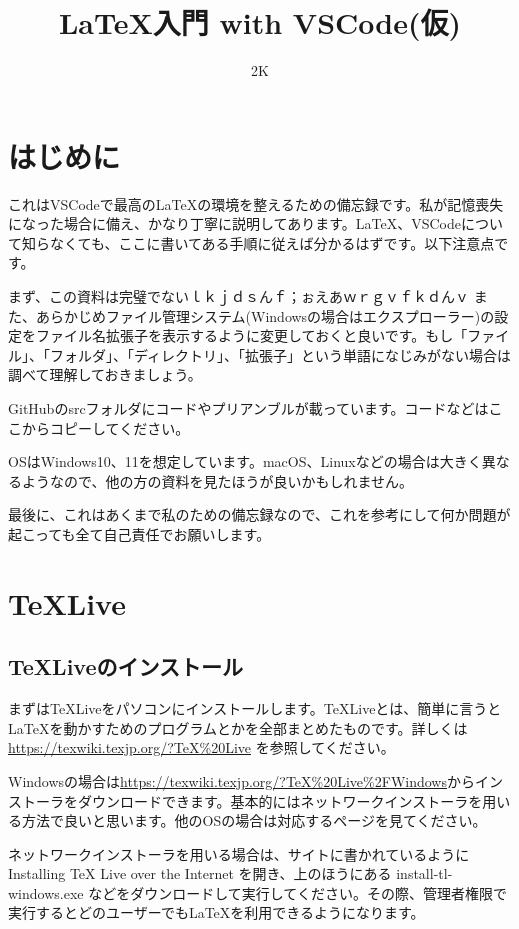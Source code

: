 

\title{\LaTeX 入門 with VSCode(仮)}
\author{2K}


\maketitle

\section{はじめに}
これはVSCodeで最高の\LaTeX の環境を整えるための備忘録です。私が記憶喪失になった場合に備え、かなり丁寧に説明してあります。LaTeX、VSCodeについて知らなくても、ここに書いてある手順に従えば分かるはずです。以下注意点です。

まず、この資料は完璧でないｌｋｊｄｓんｆ；ぉえあｗｒｇｖｆｋｄんｖ
また、あらかじめファイル管理システム(Windowsの場合はエクスプローラー)の設定をファイル名拡張子を表示するように変更しておくと良いです。もし「ファイル」、「フォルダ」、「ディレクトリ」、「拡張子」という単語になじみがない場合は調べて理解しておきましょう。

GitHubのsrcフォルダにコードやプリアンブルが載っています。コードなどはここからコピーしてください。

OSはWindows10、11を想定しています。macOS、Linuxなどの場合は大きく異なるようなので、他の方の資料を見たほうが良いかもしれません。

最後に、これはあくまで私のための備忘録なので、これを参考にして何か問題が起こっても全て自己責任でお願いします。

\section{\TeX Live}
\subsection{\TeX Liveのインストール}
まずは\TeX Liveをパソコンにインストールします。\TeX Liveとは、簡単に言うと\LaTeX を動かすためのプログラムとかを全部まとめたものです。詳しくは \url{https://texwiki.texjp.org/?TeX%20Live} を参照してください。

Windowsの場合は\url{https://texwiki.texjp.org/?TeX%20Live%2FWindows}からインストーラをダウンロードできます。基本的にはネットワークインストーラを用いる方法で良いと思います。他のOSの場合は対応するページを見てください。

ネットワークインストーラを用いる場合は、サイトに書かれているように Installing TeX Live over the Internet を開き、上のほうにある install-tl-windows.exe などをダウンロードして実行してください。その際、管理者権限で実行するとどのユーザーでも\LaTeX を利用できるようになります。

